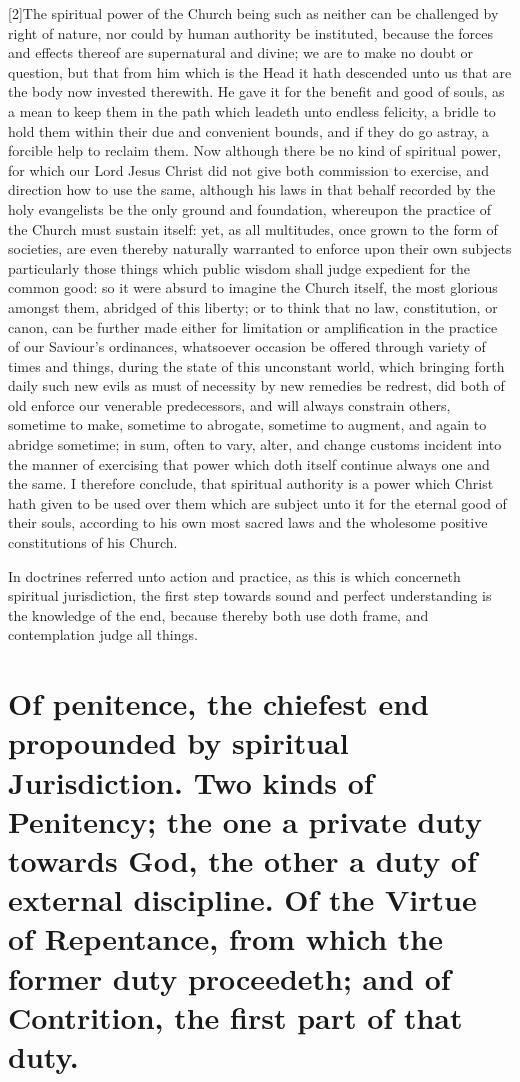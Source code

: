 [2]The spiritual power of the Church being such as neither can be challenged by right of nature, nor could by human authority be instituted, because the forces and effects thereof are supernatural and divine; we are to make no doubt or question, but that from him which is the Head it hath descended unto us that are the body now invested therewith. He gave it for the benefit and good of souls, as a mean to keep them in the path which leadeth unto endless felicity, a bridle to hold them within their due and convenient bounds, and if they do go astray, a forcible help to reclaim them. Now although there be no kind of spiritual power, for which our Lord Jesus Christ did not give both commission to exercise, and direction how to use the same, although his laws in that behalf recorded by the holy evangelists be the only ground and foundation, whereupon the practice of the Church must sustain itself: yet, as all multitudes, once grown to the form of societies, are even thereby naturally warranted to enforce upon their own subjects particularly those things which public wisdom shall judge expedient for the common good: so it were absurd to imagine the Church itself, the most glorious amongst them, abridged of this liberty; or to think that no law, constitution, or canon, can be further made either for limitation or amplification in the practice of our Saviour’s ordinances, whatsoever occasion be offered through variety of times and things, during the state of this unconstant world, which bringing forth daily such new evils as must of necessity by new remedies be redrest, did both of old enforce our venerable predecessors, and will always constrain others, sometime to make, sometime to abrogate, sometime to augment, and again to abridge sometime; in sum, often to vary, alter, and change customs incident into the manner of exercising that power which doth itself continue always one and the same. I therefore conclude, that spiritual authority is a power which Christ hath given to be used over them which are subject unto it for the eternal good of their souls, according to his own most sacred laws and the wholesome positive constitutions of his Church.

In doctrines referred unto action and practice, as this is which concerneth spiritual jurisdiction, the first step towards sound and perfect understanding is the knowledge of the end, because thereby both use doth frame, and contemplation judge all things.

\section*{Of penitence, the chiefest end propounded by spiritual Jurisdiction. Two kinds of Penitency; the one a private duty towards God, the other a duty of external discipline. Of the Virtue of Repentance, from which the former duty proceedeth; and of Contrition, the first part of that duty.}

